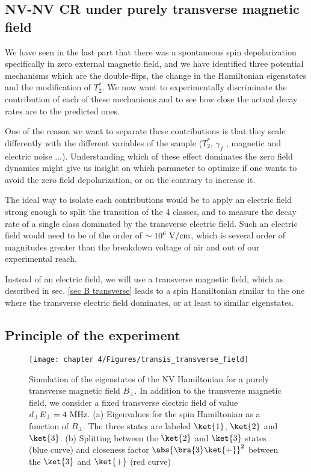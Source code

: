 \documentclass[a4paper,11pt]{report}
\begin{document}
\begin{refsection}
\section{NV-NV CR under purely transverse magnetic field}
We have seen in the last part that there was a spontaneous spin depolarization specifically in zero external magnetic field, and we have identified three potential mechanisms which are the double-flips, the change in the Hamiltonian eigenstates and the modification of $T_2^*$. We now want to experimentally discriminate the contribution of each of these mechanisms and to see how close the actual decay rates are to the predicted ones. 

One of the reason we want to separate these contributions is that they scale differently with the different variables of the sample ($T_2^*$, $\gamma_f$ , magnetic and electric noise ...). Understanding which of these effect dominates the zero field dynamics might give us insight on which parameter to optimize if one wants to avoid the zero field depolarization, or on the contrary to increase it.

The ideal way to isolate each contributions would be to apply an electric field strong enough to split the transition of the 4 classes, and to measure the decay rate of a single class dominated by the transverse electric field. Such an electric field would need to be of the order of $\sim 10^6\ \rm{V/cm}$, which is several order of magnitudes greater than the breakdown voltage of air and out of our experimental reach.

Instead of an electric field, we will use a transverse magnetic field, which as described in sec. \ref{sec B transverse} leads to a spin Hamiltonian similar to the one where the transverse electric field dominates, or at least to similar eigenstates.

\subsection{Principle of the experiment}
\begin{figure}[h]
\centering
\texttt{[image: chapter 4/Figures/transis\_transverse\_field]}
\caption{Simulation of the eigenstates of the NV Hamiltonian for  a purely transverse magnetic field $B_\perp$. In addition to the transverse magnetic field, we consider a fixed transverse electric field of value $d_\perp E_\perp=4\ \rm MHz$. (a) Eigenvalues for the spin Hamiltonian as a function of $B_\perp$. The three states are labeled $\ket{1}$, $\ket{2}$ and $\ket{3}$. (b) Splitting between the $\ket{2}$ and $\ket{3}$ states (blue curve) and closeness factor $\abs{\bra{3}\ket{+}}^2$ between the $\ket{3}$ and $\ket{+}$ (red curve)}
\label{eigenstates transverse field}
\end{figure}


\end{refsection}
\end{document}
